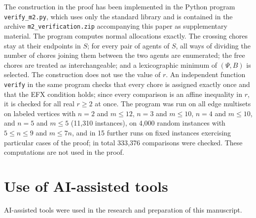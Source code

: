 \documentclass{amsart}
\numberwithin{equation}{section}
\theoremstyle{definition}
\theoremstyle{remark}
\begin{document}
The construction in the proof has been implemented in the Python program \texttt{verify\_m2.py}, which uses only the standard library and is contained in the archive \texttt{m2\_verification.zip} accompanying this paper as supplementary material. The program computes normal allocations exactly. The crossing chores stay at their endpoints in $S$; for every pair of agents of $S$, all ways of dividing the number of chores joining them between the two agents are enumerated; the free chores are treated as interchangeable; and a lexicographic minimum of $(\Psi,B)$ is selected. The construction does not use the value of $r$. An independent function \texttt{verify} in the same program checks that every chore is assigned exactly once and that the EFX condition holds; since every comparison is an affine inequality in $r$, it is checked for all real $r\ge2$ at once. The program was run on all edge multisets on labeled vertices with $n=2$ and $m\le12$, $n=3$ and $m\le10$, $n=4$ and $m\le10$, and $n=5$ and $m\le5$ (11{,}310 instances), on 4{,}000 random instances with $5\le n\le9$ and $m\le7n$, and in 15 further runs on fixed instances exercising particular cases of the proof; in total 333{,}376 comparisons were checked. These computations are not used in the proof.

\section*{Use of AI-assisted tools}

AI-assisted tools were used in the research and preparation of this manuscript.
\end{document}
